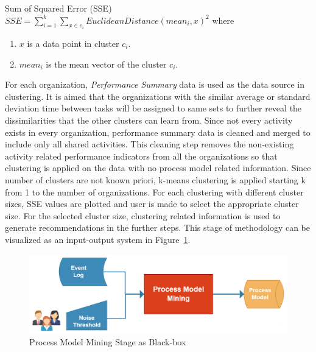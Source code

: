 \theoremstyle{definition}
\begin{definition}{Sum of Squared Error (SSE)}
$SSE = \sum_{i=1}^{k} \sum_{x \in c_{i}} EuclideanDistance(mean_{i}, x)^{2}$ where
\begin{enumerate}
  \item $x$ is a data point in cluster $c_{i}$.
  \item $mean_{i}$ is the mean vector of the cluster $c_{i}$.
\end{enumerate}
\end{definition}

For each organization, \textit{Performance Summary} data is used as the data source in clustering. It is aimed that the organizations with the similar average or standard deviation time between tasks will be assigned to same sets to further reveal the dissimilarities that the other clusters can learn from. Since not every activity exists in every organization, performance summary data is cleaned and merged to include only all shared activities. This cleaning step removes the non-existing activity related performance indicators from all the organizations so that clustering is applied on the data with no process model related information. Since number of clusters are not known priori, k-means clustering is applied starting k from 1 to the number of organizations. For each clustering with different cluster sizes, SSE values are plotted and user is made to select the appropriate cluster size. For the selected cluster size, clustering related information is used to generate recommendations in the further steps. This stage of methodology can be visualized as an input-output system in Figure~\ref{fig:process-model-mining-blackbox}.

\begin{figure}
  \centering
  \includegraphics[width=\textwidth]{4_methodology/process-model-mining-blackbox}
  \caption{Process Model Mining Stage as Black-box }
  \label{fig:process-model-mining-blackbox}
\end{figure}

